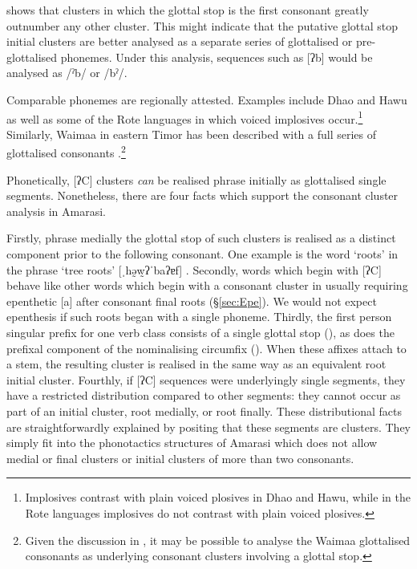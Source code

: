  shows that clusters in which the glottal stop
is the first consonant greatly outnumber any other cluster.
This might indicate that the putative glottal stop initial clusters
are better analysed as a separate series of glottalised or pre-glottalised phonemes.
Under this analysis, sequences such as [ʔb] would be analysed as /ˀb/ or /bˀ/.

Comparable phonemes are regionally attested.
Examples include Dhao and Hawu \citep{gr10}
as well as some of the Rote languages \citep{ta07}
in which voiced implosives occur.\footnote{
		Implosives contrast with plain voiced plosives in Dhao and Hawu,
		while in the Rote languages implosives
		do not contrast with plain voiced plosives.}
Similarly, Waima{\Q}a in eastern Timor has been described with a full series
of glottalised consonants \citep{habo02,hahi06}.\footnote{
		Given the discussion in \citet{do03},
		it may be possible to analyse the Waima{\Q}a glottalised
		consonants as underlying consonant clusters involving a glottal stop.}

Phonetically, [ʔC] clusters \emph{can} be realised
phrase initially as glottalised single segments.
Nonetheless, there are four facts which
support the consonant cluster analysis in Amarasi.

Firstly, phrase medially the glottal stop of such clusters
is realised as a distinct component prior to the following consonant.
One example is the word  `roots' in the phrase
 `tree roots' {\ra} [ˌhə̰w̰ʔˈbaʔɐf] {}.
Secondly, words which begin with [ʔC] behave like other words which begin with a consonant cluster
in usually requiring epenthetic [a] after consonant final roots ({\S}\ref{sec:Epe}).
We would not expect epenthesis if such roots began with a single phoneme.
Thirdly, the first person singular prefix for one verb class
consists of a single glottal stop  (), as does the prefixal
component of the nominalising circumfix  ().
When these affixes attach to a stem, the resulting cluster
is realised in the same way as an equivalent root initial cluster.
Fourthly, if [ʔC] sequences were underlyingly single segments,
they have a restricted distribution compared to other segments:
they cannot occur as part of an initial cluster, root medially, or root finally.
These distributional facts are straightforwardly explained by
positing that these segments are clusters.
They simply fit into the phonotactics structures of Amarasi
which does not allow medial or final clusters or initial
clusters of more than two consonants.

